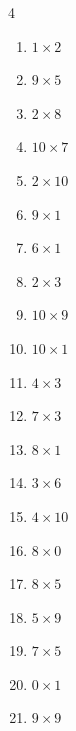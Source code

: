 \begin{multicols}{4}
\begin{enumerate}
  \item $1\times 2$
        \phantom{$=2$}

  \item $9\times 5$
        \phantom{$=45$}

  \item $2\times 8$
        \phantom{$=16$}

  \item $10\times 7$
        \phantom{$=70$}

  \item $2\times 10$
        \phantom{$=20$}

  \item $9\times 1$
        \phantom{$=9$}

  \item $6\times 1$
        \phantom{$=6$}

  \item $2\times 3$
        \phantom{$=6$}

  \item $10\times 9$
        \phantom{$=90$}

  \item $10\times 1$
        \phantom{$=10$}

  \item $4\times 3$
        \phantom{$=12$}

  \item $7\times 3$
        \phantom{$=21$}

  \item $8\times 1$
        \phantom{$=8$}

  \item $3\times 6$
        \phantom{$=18$}

  \item $4\times 10$
        \phantom{$=40$}

  \item $8\times 0$
        \phantom{$=0$}

  \item $8\times 5$
        \phantom{$=40$}

  \item $5\times 9$
        \phantom{$=45$}

  \item $7\times 5$
        \phantom{$=35$}

  \item $0\times 1$
        \phantom{$=0$}

  \item $9\times 9$
        \phantom{$=81$}


\end{enumerate}
\end{multicols}
